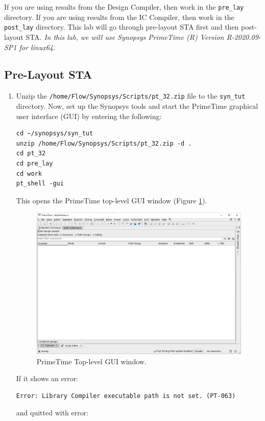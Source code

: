 \documentclass[a4paper,12pt,twoside]{article}
\begin{document}
If you are using results from the Design Compiler, then work in the \texttt{pre\_lay} directory. If you are using results from the IC Compiler, then work in the \texttt{post\_lay} directory. This lab will go through pre-layout STA first and then post-layout STA. \textit{In this lab, we will use Synopsys PrimeTime (R) Version R-2020.09-SP1 for linux64}.
\subsection{Pre-Layout STA}\label{SPreSTA}
\begin{enumerate}
    \item Unzip the \texttt{/home/Flow/Synopsys/Scripts/pt\_32.zip} file to the \texttt{syn\_tut} directory. Now, set up the Synopsys tools and start the PrimeTime graphical user interface (GUI) by entering the following:
    \begin{verbatim}
cd ~/synopsys/syn_tut
unzip /home/Flow/Synopsys/Scripts/pt_32.zip -d .
cd pt_32
cd pre_lay
cd work
pt_shell -gui
    \end{verbatim}
    This opens the PrimeTime top-level GUI window (Figure \ref{f32}).
    \begin{figure}[H]
        \centering
        \includegraphics[width=\textwidth]{images/32.png}
        \caption{PrimeTime Top-level GUI window.}
        \label{f32}
    \end{figure}
    If it shows an error:
    \begin{verbatim}
Error: Library Compiler executable path is not set. (PT-063)
    \end{verbatim}
    and quitted with error:
    \begin{verbatim}

\end{verbatim}
\end{enumerate}
\end{document}
